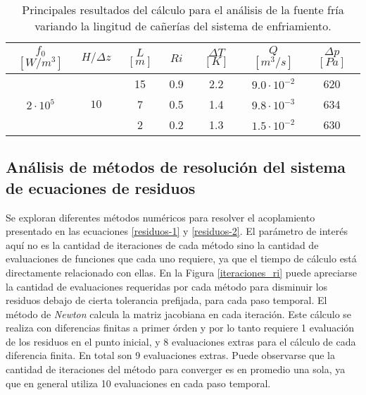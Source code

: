 \begin{table}[h!]
  \centering
  \begin{tabular}{ c c c c c c c } 
      \hline
      \multicolumn{1}{c}{$f_0$ $[W/m^3]$} & \multicolumn{1}{c}{$H / \Delta z$} & \multicolumn{1}{c}{$L$ $[m]$} & \multicolumn{1}{c}{$Ri$} & \multicolumn{1}{c}{$\Delta T$ $[K]$} & \multicolumn{1}{c}{$Q$$[m^3/s]$}& \multicolumn{1}{c}{$\Delta p$ $[Pa]$} \\ \hline
      \multirow{3}{*}{$2\cdot10^5$} & \multirow{3}{*}{$10$} & 15 & 0.9 & 2.2 & $9.0 \cdot 10^{-2}$ & 620 \\
                         & & 7 & 0.5 & 1.4 & $9.8 \cdot 10^{-3}$ & 634 \\                          
                         & & 2 & 0.2 & 1.3 & $1.5 \cdot 10^{-2}$ & 630 \\ \hline
   \end{tabular}   
   \caption[Principales resultados del cálculo para el análisis de la fuente fría variando la lingitud de cañerías del sistema de enfriamiento]
   {Principales resultados del cálculo para el análisis de la fuente fría variando la lingitud de cañerías del sistema de enfriamiento.}
   \label{tab-k}
\end{table}


\subsection*{Análisis de métodos de resolución del sistema de ecuaciones de residuos}

Se exploran diferentes métodos numéricos para resolver el acoplamiento presentado en las ecuaciones \ref{residuos-1} y \ref{residuos-2}.
El parámetro de interés aquí no es la cantidad de iteraciones de cada método sino la cantidad de evaluaciones de funciones que cada uno requiere,
ya que el tiempo de cálculo está directamente relacionado con ellas.
En la Figura \ref{iteraciones_ri} puede apreciarse la cantidad de evaluaciones requeridas 
por cada método para disminuir los residuos debajo de cierta tolerancia prefijada, para cada paso temporal.
El método de \textit{Newton} calcula la matriz jacobiana en cada iteración.
Este cálculo se realiza con diferencias finitas a primer órden y por lo tanto requiere 1 evaluación de los residuos en el punto inicial,
y 8 evaluaciones extras para el cálculo de cada diferencia finita.
En total son 9 evaluaciones extras.
Puede observarse que la cantidad de iteraciones del método para converger es en promedio una sola, ya que en general utiliza 10 evaluaciones en cada paso temporal.

